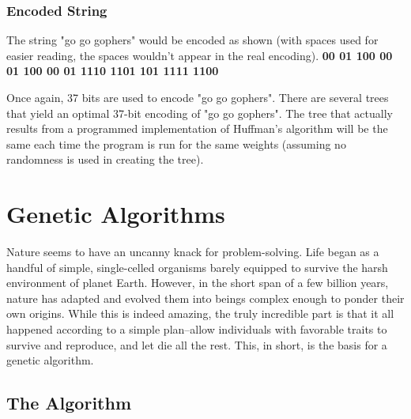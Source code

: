 \documentclass[12pt]{report}
\begin{document}
\subsection{Encoded String}

The string "go go gophers" would be encoded as shown (with spaces used for easier reading, the spaces wouldn't appear in the real encoding).
\textbf{00 01 100 00 01 100 00 01 1110 1101 101 1111 1100}

Once again, 37 bits are used to encode "go go gophers". There are several trees that yield an optimal 37-bit encoding of "go go gophers". The tree that actually results from a programmed implementation of Huffman's algorithm will be the same each time the program is run for the same weights (assuming no randomness is used in creating the tree).



\pagestyle{fancy}
\chead{}
\rfoot{\small{\thepage}}
\renewcommand{\headrulewidth}{0.4pt}
\renewcommand{\footrulewidth}{0.4pt}













\chapter{Genetic Algorithms}

Nature seems to have an uncanny knack for problem-solving. Life began as a handful of simple, single-celled organisms barely equipped to survive the harsh environment of planet Earth. However, in the short span of a few billion years, nature has adapted and evolved them into beings complex enough to ponder their own origins. While this is indeed amazing, the truly incredible part is that it all happened according to a simple plan--allow individuals with favorable traits to survive and reproduce, and let die all the rest. This, in short, is the basis for a genetic algorithm. 

\section{The Algorithm}
\end{document}
